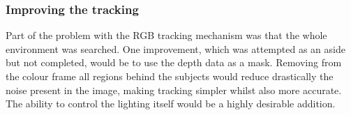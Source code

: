 \subsubsection{Improving the tracking}
Part of the problem with the RGB tracking mechanism was that the whole environment was searched. One improvement, which was attempted as an aside but not completed, would be to use the depth data as a mask. Removing from the colour frame all regions behind the subjects would reduce drastically the noise present in the image, making tracking simpler whilst also more accurate.\\

The ability to control the lighting itself would be a highly desirable addition.\\

